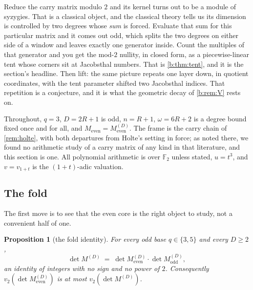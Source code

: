 \documentclass[11pt]{amsart}
\newtheorem{proposition}[theorem]{Proposition}
\theoremstyle{definition}
\theoremstyle{remark}
\begin{document}
Reduce the carry matrix modulo $2$ and its kernel turns out to be a module of syzygies. That is a classical object, and the classical theory tells us its dimension is controlled by two degrees whose \emph{sum} is forced. Evaluate that sum for this particular matrix and it comes out odd, which splits the two degrees on either side of a window and leaves exactly one generator inside. Count the multiples of that generator and you get the mod-$2$ nullity, in closed form, as a piecewise-linear tent whose corners sit at Jacobsthal numbers. That is \cref{b:thm:tent}, and it is the section's headline. Then lift: the same picture repeats one layer down, in quotient coordinates, with the tent parameter shifted two Jacobsthal indices. That repetition is a conjecture, and it is what the geometric decay of \cref{b:rem:V} rests on.

Throughout, $q = 3$, $D = 2R+1$ is odd, $n = R+1$, $\omega = 6R+2$ is a degree bound fixed once and for all, and $M_{\mathrm{even}} = M_{\mathrm{even}}^{(D)}$. The frame is the carry chain of \cref{rem:holte}, with both departures from Holte's setting \cite{holte} in force; as noted there, we found no arithmetic study of a carry matrix of any kind in that literature, and this section is one. All polynomial arithmetic is over $\mathbb{F}_2$ unless stated, $u = t^3$, and $v = v_{1+t}$ is the $(1+t)$-adic valuation.

\subsection*{The fold}

The first move is to see that the even core is the right object to study, not a convenient half of one.

\begin{proposition}[the fold identity]
\label{b:prop:fold}
For every odd base $q \in \{3,5\}$ and every $D \ge 2$,
\[
  \det M^{(D)} \;=\; \det M_{\mathrm{even}}^{(D)} \cdot \det M_{\mathrm{odd}}^{(D)} ,
\]
an identity of integers with no sign and no power of $2$. Consequently $v_2(\det M_{\mathrm{even}}^{(D)})$ is at most $v_2(\det M^{(D)})$.
\end{proposition}
\end{document}
